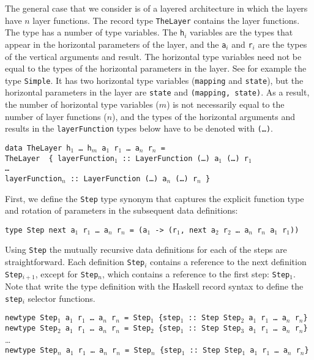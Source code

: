 The general case that we consider is of a layered architecture in which the layers have $n$ layer functions. The record type \texttt{TheLayer} contains the layer functions. The type has a number of type variables. The \texttt{h$_i$} variables are the types that appear in the horizontal parameters of the layer, and the \texttt{a$_i$} and \texttt{r$_i$} are the types of the vertical arguments and result. The horizontal type variables need not be equal to the types of the horizontal parameters in the layer. See for example the type \texttt{Simple}. It has two horizontal type variables (\texttt{mapping} and \texttt{state}), but the horizontal parameters in the layer are \texttt{state} and \texttt{(mapping, state)}. As a result, the number of horizontal type variables ($m$) is not necessarily equal to the number of layer functions ($n$), and the types of the horizontal arguments and results in the \texttt{layerFunction} types below have to be denoted with \texttt{(\dots)}.

\begin{tabbing}
{\tt data Th}\={\tt eLayer h$_1$ \dots ~h$_m$ a$_1$ r$_1$ \dots ~a$_n$ r$_n$ = }\\
\> {\tt TheLayer~ \{~}\={\tt layerFunction$_1$}\verb| :: |{\tt LayerFunction (\dots) a$_1$ (\dots) r$_1$}\\
\>\> {\tt \dots }\\
\>\> {\tt layerFunction$_n$}\verb| :: |{\tt LayerFunction (\dots) a$_n$ (\dots) r$_n$ \}}\\
\end{tabbing}

First, we define the \texttt{Step} type synonym that captures the explicit function type and rotation of parameters in the subsequent data definitions:

\begin{tabbing}
{\tt type St}\={\tt ep next a$_1$ r$_1$ \dots~a$_n$ r$_n$ = (a$_1$ -> (r$_1$, next a$_2$ r$_2$ \dots~a$_n$ r$_n$ a$_1$ r$_1$))}
\end{tabbing}

Using \texttt{Step} the mutually recursive data definitions for each of the steps are straightforward. Each definition \texttt{Step$_i$} contains a reference to the next definition \texttt{Step$_{i+1}$}, except for \texttt{Step$_n$}, which contains a reference to the first step: \texttt{Step$_1$}. Note that write the type definition with the Haskell record syntax to define the \texttt{step$_i$} selector functions.

{\tt newtype Step$_1$ a$_1$ r$_1$ \dots~a$_n$ r$_n$ = Step$_1$ \{step$_1$}\verb| :: |{\tt Step Step$_2$ a$_1$ r$_1$ \dots~a$_n$ r$_n$\}}\\
{\tt newtype Step$_2$ a$_1$ r$_1$ \dots~a$_n$ r$_n$ = Step$_2$ \{step$_1$}\verb| :: |{\tt Step Step$_3$ a$_1$ r$_1$ \dots~a$_n$ r$_n$\}}\\
\dots \\
{\tt newtype Step$_n$ a$_1$ r$_1$ \dots~a$_n$ r$_n$ = Step$_n$ \{step$_1$}\verb| :: |{\tt Step Step$_1$ a$_1$ r$_1$ \dots~a$_n$ r$_n$\}}

